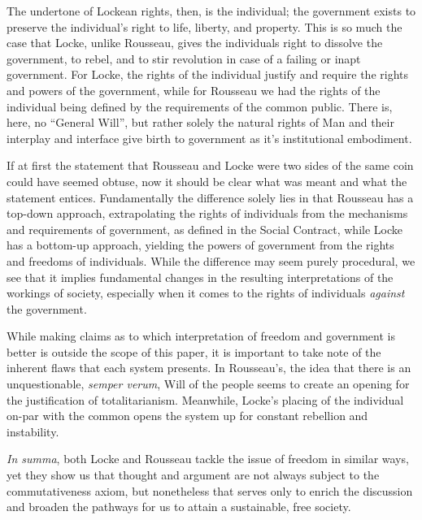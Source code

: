 \documentclass[12pt,letterpaper]{article}
\begin{document}
\begin{spacing}{2}
    The undertone of Lockean rights, then, is the individual; the government
    exists to preserve the individual's right to life, liberty, and
    property.\autocite[p.~63]{perry-bock-2012} This is so much the case that
    Locke, unlike Rousseau, gives the individuals right to dissolve the
    government, to rebel, and to stir revolution in case of a failing or inapt
    government. For Locke, the rights of the individual justify and require the
    rights and powers of the government, while for Rousseau we had the rights of
    the individual being defined by the requirements of the common public. There
    is, here, no ``General Will'', but rather solely the natural rights of Man
    and their interplay and interface give birth to government as it's
    institutional embodiment.\autocite{perry-bock-2012}

    If at first the statement that Rousseau and Locke were two sides of the same
    coin could have seemed obtuse, now it should be clear what was meant and
    what the statement entices. Fundamentally the difference solely lies in that
    Rousseau has a top-down approach, extrapolating the rights of individuals
    from the mechanisms and requirements of government, as defined in the Social
    Contract, while Locke has a bottom-up approach, yielding the powers of
    government from the rights and freedoms of individuals. While the difference
    may seem purely procedural, we see that it implies fundamental changes in
    the resulting interpretations of the workings of society, especially when it
    comes to the rights of individuals \textit{against} the government.

    While making claims as to which interpretation of freedom and government is
    better is outside the scope of this paper, it is important to take note of
    the inherent flaws that each system presents. In Rousseau's, the idea that
    there is an unquestionable, \textit{semper verum}, Will of the people seems
    to create an opening for the justification of
    totalitarianism.\autocite[pp.~78--79]{perry-bock-2012} Meanwhile, Locke's
    placing of the individual on-par with the common opens the system up for
    constant rebellion and instability.

    \textit{In summa}, both Locke and Rousseau tackle the issue of freedom in similar
    ways, yet they show us that thought and argument are not always subject to
    the commutativeness axiom, but nonetheless that serves only to enrich the
    discussion and broaden the pathways for us to attain a sustainable, free
    society.


\end{spacing}
\newpage
\printbibliography[heading=bibintoc,title={Bibliography}]
\end{document}
